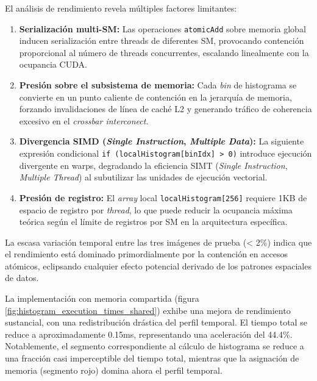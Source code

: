         El análisis de rendimiento revela múltiples factores limitantes:

        \begin{enumerate}

            \item \textbf{Serialización multi-SM:} Las operaciones \texttt{atomicAdd} sobre memoria global inducen serialización entre threads de diferentes SM, provocando contención proporcional al número de threads concurrentes, escalando linealmente con la ocupancia CUDA.
        
            \item \textbf{Presión sobre el subsistema de memoria:} Cada \textit{bin} de histograma se convierte en un punto caliente de contención en la jerarquía de memoria, forzando invalidaciones de línea de caché L2 y generando tráfico de coherencia excesivo en el \textit{crossbar interconect}.

            \item \textbf{Divergencia SIMD (\textit{Single Instruction}, \textit{Multiple Data}):} La siguiente expresión condicional \texttt{if (localHistogram[binIdx] > 0)} introduce ejecución divergente en warps, degradando la eficiencia SIMT (\textit{Single Instruction}, \textit{Multiple Thread}) al subutilizar las unidades de ejecución vectorial.

            \item \textbf{Presión de registro:} El \textit{array} local \texttt{localHistogram[256]} requiere 1KB de espacio de registro por \textit{thread}, lo que puede reducir la ocupancia máxima teórica según el límite de registros por SM en la arquitectura específica.

        \end{enumerate}

        La escasa variación temporal entre las tres imágenes de prueba (< 2\%) indica que el rendimiento está dominado primordialmente por la contención en accesos atómicos, eclipsando cualquier efecto potencial derivado de los patrones espaciales de datos.
        
        La implementación con memoria compartida (figura \ref{fig:histogram_execution_times_shared}) exhibe una mejora de rendimiento sustancial, con una redistribución drástica del perfil temporal. El tiempo total se reduce a aproximadamente 0.15ms, representando una aceleración del 44.4\%. Notablemente, el segmento correspondiente al cálculo de histograma se reduce a una fracción casi imperceptible del tiempo total, mientras que la asignación de memoria (segmento rojo) domina ahora el perfil temporal.


